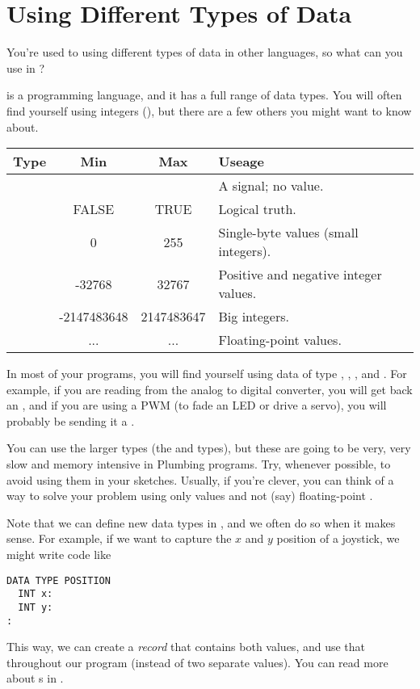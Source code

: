 \section{Using Different Types of Data}

\problem
You're used to using different types of data in other languages, so what can you use in \occam?


\solution
\occam is a programming language, and it has a full range of data types. You will often find yourself using integers (\INT), but there are a few others you might want to know about.


	\begin{tabular}{l|c|c|p{1in}}
		\hline
		Type & Min & Max & Useage \\
		\hline
		\SIGNALT & & & A signal; no value. \\
		\BOOL & FALSE & TRUE & Logical truth. \\
		\BYTE & 0 & 255 & Single-byte values (small integers). \\
		\INT & -32768 & 32767 & Positive and negative integer values. \\
		\INTTT &  -2147483648 & 2147483647 & Big integers. \\
		\REALTT & ... & ... & Floating-point values. \\
		\hline
	\end{tabular}

\discussion
In most of your programs, you will find yourself using data of type \SIGNALT, \BOOL, \BYTE, and \INT. For example, if you are reading from the analog to digital converter, you will get back an \INT, and if you are using a PWM \PROC (to fade an LED or drive a servo), you will probably be sending it a \BYTE. 

You can use the larger types (the \INTTT and \REALTT types), but these are going to be very, very slow and memory intensive in Plumbing programs. Try, whenever possible, to avoid using them in your sketches. Usually, if you're clever, you can think of a way to solve your problem using only \INT values and not (say) floating-point \REALTT.

Note that we can define new data types in \occam, and we often do so when it makes sense. For example, if we want to capture the $x$ and $y$ position of a joystick, we might write code like

\begin{lstlisting}
DATA TYPE POSITION
  INT x:
  INT y:
:
\end{lstlisting}

This way, we can create a \emph{record} that contains both values, and use that throughout our program (instead of two separate values). You can read more about {\RECORD}s in \FIXME.

\seealso

\XXX
